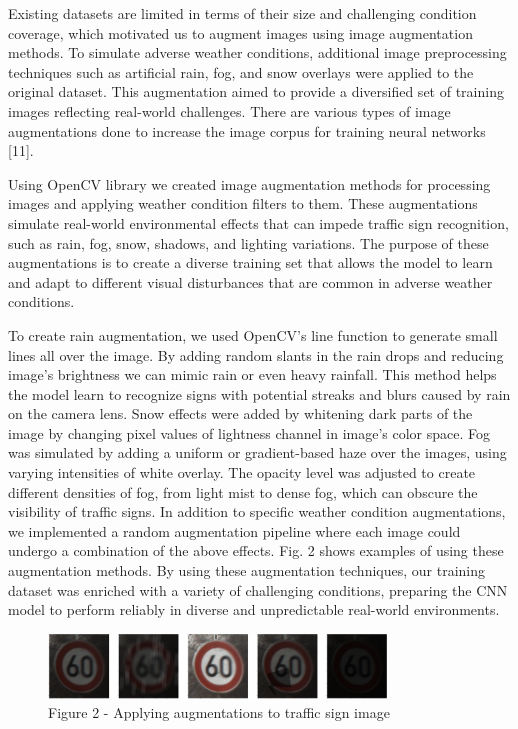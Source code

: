 \begin{multicols}{2}
Existing datasets are limited in terms of their size and challenging
condition coverage, which motivated us to augment images using image
augmentation methods. To simulate adverse weather conditions, additional
image preprocessing techniques such as artificial rain, fog, and snow
overlays were applied to the original dataset. This augmentation aimed
to provide a diversified set of training images reflecting real-world
challenges. There are various types of image augmentations done to
increase the image corpus for training neural networks {[}11{]}.

Using OpenCV library we created image augmentation methods for
processing images and applying weather condition filters to them. These
augmentations simulate real-world environmental effects that can impede
traffic sign recognition, such as rain, fog, snow, shadows, and lighting
variations. The purpose of these augmentations is to create a diverse
training set that allows the model to learn and adapt to different
visual disturbances that are common in adverse weather conditions.

To create rain augmentation, we used OpenCV's line function to generate
small lines all over the image. By adding random slants in the rain
drops and reducing image's brightness we can mimic rain or even heavy
rainfall. This method helps the model learn to recognize signs with
potential streaks and blurs caused by rain on the camera lens. Snow
effects were added by whitening dark parts of the image by changing
pixel values of lightness channel in image's color space. Fog was
simulated by adding a uniform or gradient-based haze over the images,
using varying intensities of white overlay. The opacity level was
adjusted to create different densities of fog, from light mist to dense
fog, which can obscure the visibility of traffic signs. In addition to
specific weather condition augmentations, we implemented a random
augmentation pipeline where each image could undergo a combination of
the above effects. Fig. 2 shows examples of using these augmentation
methods. By using these augmentation techniques, our training dataset
was enriched with a variety of challenging conditions, preparing the CNN
model to perform reliably in diverse and unpredictable real-world
environments.
\end{multicols}

\begin{figure}[H]
	\centering
	\includegraphics[width=0.8\textwidth]{assets/58}
	\caption*{Figure 2 - Applying augmentations to traffic sign image}
\end{figure}

